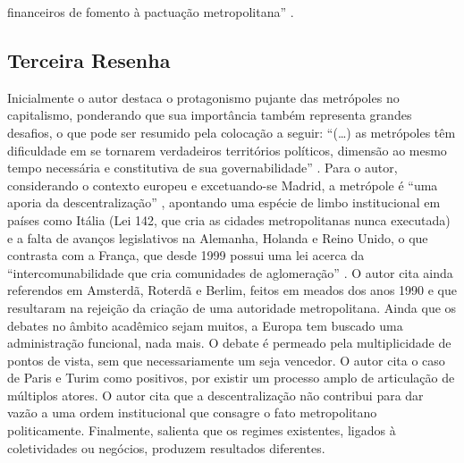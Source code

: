 \documentclass[hidelinks,a4paper,nofootinbib,aps,reprint,superscriptaddress]{revtex4}
\begin{document}
financeiros de fomento à pactuação metropolitana'' \cite[p.428]{klink2009}.
	
	\subsection{Terceira Resenha}
	
	Inicialmente o autor destaca o protagonismo pujante das metrópoles no capitalismo, ponderando que sua importância também representa grandes desafios, o que pode ser resumido pela colocação a seguir: ``(\dots) as metrópoles têm dificuldade em se tornarem verdadeiros territórios políticos, dimensão ao mesmo tempo necessária e constitutiva de sua governabilidade'' \cite[p.300]{lefevre2009}. Para o autor, considerando o contexto europeu e excetuando-se Madrid, a metrópole é ``uma aporia da descentralização'' \cite[p.301]{klink2009}, apontando uma espécie de limbo institucional em países como Itália (Lei 142, que cria as cidades metropolitanas nunca executada) e a falta de avanços legislativos na Alemanha, Holanda e Reino Unido, o que contrasta com a França, que desde 1999 possui uma lei acerca da ``intercomunabilidade que cria comunidades de aglomeração'' \cite[p.301]{klink2009}. O autor cita ainda referendos em Amsterdã, Roterdã e Berlim, feitos em meados dos anos 1990 e que resultaram na rejeição da criação de uma autoridade metropolitana. Ainda que os debates no âmbito acadêmico sejam muitos, a Europa tem buscado uma administração funcional, nada mais. O debate é permeado pela multiplicidade de pontos de vista, sem que necessariamente um seja vencedor. O autor cita o caso de Paris e Turim como positivos, por existir um processo amplo de articulação de múltiplos atores. O autor cita que a descentralização não contribui para dar vazão a uma ordem institucional que consagre o fato metropolitano politicamente. Finalmente, salienta que os regimes existentes, ligados à coletividades ou negócios, produzem resultados diferentes.
	
	
	
	
\end{document}

